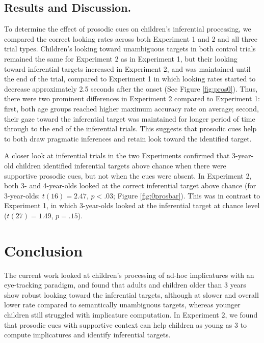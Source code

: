 \documentclass[10pt,letterpaper]{article}
\begin{document}
\subsection{Results and Discussion.}

To determine the effect of prosodic cues on children's inferential processing, we compared the correct looking rates across both Experiment 1 and 2 and all three trial types. Children's looking toward unambiguous targets in both control trials remained the same for Experiment 2 as in Experiment 1, but their looking toward inferential targets increased in Experiment 2, and was maintained until the end of the trial, compared to Experiment 1 in which looking rates started to decrease approximately 2.5 seconds after the onset (See Figure \ref{fig:pros0}). Thus, there were two prominent differences in Experiment 2 compared to Experiment 1: first, both age groups reached higher maximum accuracy rate on average; second, their gaze toward the inferential target was maintained for longer period of time through to the end of the inferential trials. This suggests that prosodic cues help to both draw pragmatic inferences and retain look toward the identified target. 

A closer look at inferential trials in the two Experiments confirmed that 3-year-old children identified inferential targets above chance when there were supportive prosodic cues, but not when the cues were absent. In Experiment 2, both 3- and 4-year-olds looked at the correct inferential target above chance (for 3-year-olds: $t(16) = 2.47$, $p < .03$; Figure \ref{fig:0prosbar}). This was in contrast to Experiment 1, in which 3-year-olds looked at the inferential target at chance level ($t(27) = 1.49$, $p = .15$). 

\section{Conclusion}

The current work looked at children's processing of ad-hoc implicatures with an eye-tracking paradigm, and found that adults and children older than 3 years show robust looking toward the inferential targets, although at slower and overall lower rate compared to semantically unambiguous targets, whereas younger children still struggled with implicature computation. In Experiment 2, we found that prosodic cues with supportive context can help children as young as 3 to compute implicatures and identify inferential targets. 
\end{document}
